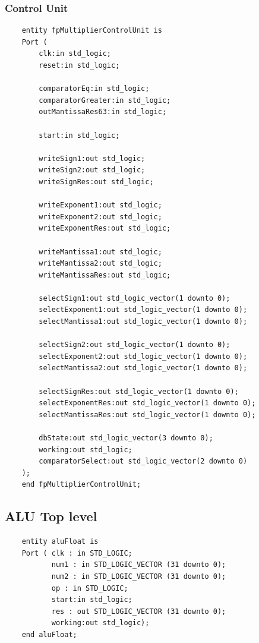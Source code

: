 \documentclass[a4paper,10pt]{article}
\begin{document}
    \subsubsection{Control Unit}
    \begin{lstlisting}
    entity fpMultiplierControlUnit is
	Port (
		clk:in std_logic;
		reset:in std_logic;

		comparatorEq:in std_logic;
		comparatorGreater:in std_logic;
		outMantissaRes63:in std_logic;

		start:in std_logic;

		writeSign1:out std_logic;
		writeSign2:out std_logic;
		writeSignRes:out std_logic;

		writeExponent1:out std_logic;
		writeExponent2:out std_logic;
		writeExponentRes:out std_logic;

		writeMantissa1:out std_logic;
		writeMantissa2:out std_logic;
		writeMantissaRes:out std_logic;

		selectSign1:out std_logic_vector(1 downto 0);
		selectExponent1:out std_logic_vector(1 downto 0);
		selectMantissa1:out std_logic_vector(1 downto 0);

		selectSign2:out std_logic_vector(1 downto 0);
		selectExponent2:out std_logic_vector(1 downto 0);
		selectMantissa2:out std_logic_vector(1 downto 0);

		selectSignRes:out std_logic_vector(1 downto 0);
		selectExponentRes:out std_logic_vector(1 downto 0);
		selectMantissaRes:out std_logic_vector(1 downto 0);

		dbState:out std_logic_vector(3 downto 0);
		working:out std_logic;
		comparatorSelect:out std_logic_vector(2 downto 0)
	);
    end fpMultiplierControlUnit;

    \end{lstlisting}

    \newpage
    \subsection{ALU Top level}
    \label{sec:aluTop}
    \begin{lstlisting}
    entity aluFloat is
    Port ( clk : in STD_LOGIC;
           num1 : in STD_LOGIC_VECTOR (31 downto 0);
           num2 : in STD_LOGIC_VECTOR (31 downto 0);
           op : in STD_LOGIC;
           start:in std_logic;
           res : out STD_LOGIC_VECTOR (31 downto 0);
           working:out std_logic);
    end aluFloat;
    \end{lstlisting}

    \newpage
\end{document}
